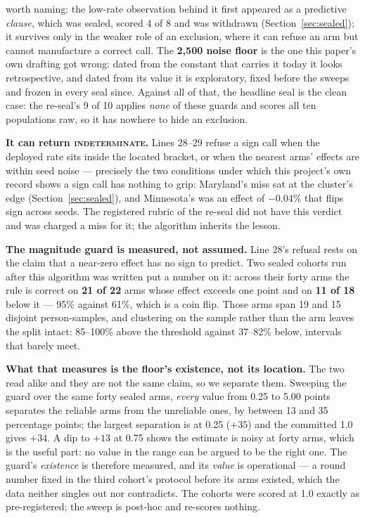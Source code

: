 \documentclass[9pt,conference]{IEEEtran}
\begin{document}
worth naming: the low-rate observation behind it first appeared as a predictive
\emph{clause}, which was sealed, scored 4 of 8 and was withdrawn
(Section~\ref{sec:sealed}); it survives only in the weaker role of an exclusion, where it
can refuse an arm but cannot manufacture a correct call. The \textbf{2{,}500 noise floor} is
the one this paper's own drafting got wrong: dated from the constant that carries it today
it looks retrospective, and dated from its value it is exploratory, fixed before the
sweeps and frozen in every seal since. Against all of that, the headline
seal is the clean case: the re-seal's 9 of 10 applies \emph{none} of these guards and scores
all ten populations raw, so it has nowhere to hide an exclusion.

\textbf{It can return \textsc{indeterminate}.} Lines 28--29 refuse a sign call when the
deployed rate sits inside the located bracket, or when the nearest arms' effects are
within seed noise --- precisely the two conditions under which this project's own record
shows a sign call has nothing to grip: Maryland's miss sat at the cluster's edge
(Section~\ref{sec:sealed}), and Minnesota's was an effect of $-0.04\%$ that flips sign
across seeds. The registered
rubric of the re-seal did not have this verdict and was charged a miss for it; the
algorithm inherits the lesson.

\textbf{The magnitude guard is measured, not assumed.} Line 28's refusal rests on the
claim that a near-zero effect has no sign to predict. Two sealed cohorts run after this
algorithm was written put a number on it: across their forty arms the rule is correct on
\textbf{21 of 22} arms whose effect exceeds one point and on \textbf{11 of 18} below it ---
95\% against 61\%, which is a coin flip. Those arms span 19 and 15 disjoint person-samples,
and clustering on the sample rather than the arm leaves the split intact: 85--100\% above
the threshold against 37--82\% below, intervals that barely meet.

\textbf{What that measures is the floor's existence, not its location.} The two read alike
and they are not the same claim, so we separate them. Sweeping the guard over the same forty
sealed arms, \emph{every} value from 0.25 to 5.00 points separates the reliable arms from the
unreliable ones, by between 13 and 35 percentage points; the largest separation is at 0.25
($+35$) and the committed 1.0 gives $+34$. A dip to $+13$ at 0.75 shows the estimate is noisy
at forty arms, which is the useful part: no value in the range can be argued to be the right
one. The guard's \emph{existence} is therefore measured, and its \emph{value} is
operational --- a round number fixed in the third cohort's protocol before its arms existed,
which the data neither singles out nor contradicts. The cohorts were scored at 1.0 exactly as
pre-registered; the sweep is post-hoc and re-scores nothing.
\end{document}
